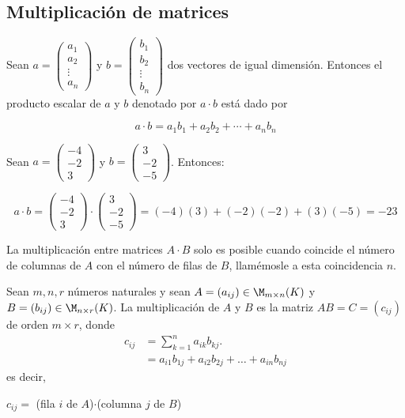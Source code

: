 \subsection{Multiplicación de matrices}


\begin{defin}
Sean $a = \begin{pmatrix} a_1 \\ a_2 \\ \vdots \\ a_n \end{pmatrix}$ y $b = \begin{pmatrix} b_1 \\ b_2 \\ \vdots \\ b_n \end{pmatrix}$ dos vectores de igual dimensión. Entonces el producto escalar de $a$ y $b$ denotado por $a \cdot b$ está dado por 

$$a \cdot b = a_1b_1 + a_2b_2 + \cdots + a_nb_n$$
\end{defin}





\begin{ejem}
Sean $a =  \begin{pmatrix} -4 \\ -2 \\ 3 \end{pmatrix}$ y $b =  \begin{pmatrix} 3 \\ -2 \\ -5 \end{pmatrix}$. Entonces:

$$a \cdot b = \begin{pmatrix} -4 \\ -2 \\ 3 \end{pmatrix} \cdot \begin{pmatrix} 3 \\ -2 \\ -5 \end{pmatrix} = (-4)(3) + (-2)(-2) + (3)(-5) = -23$$
\end{ejem}

La multiplicación entre matrices $A \cdot B$ solo es posible cuando coincide el número de columnas
de $A$ con el número de filas de $B$, llamémosle a esta coincidencia $n$.
\begin{defin}
Sean $m, n, r$ n\'umeros naturales y sean $A=(a_{ij})\in \M_{m\times n}(K)$ y \newline ${B=(b_{ij})\in \M_{n\times r}(K)}$. La multiplicaci\'on de $A$ y $B$ es la matriz $AB=C=(c_{ij})$ de orden $m\times r$, donde 
\begin{align*}
   c_{ij}&=\sum^n_{k=1}a_{ik}b_{kj}.\\
 &= a_{i1}b_{1j} + a_{i2}b_{2j} + \dots +a_{in}b_{nj} 
\end{align*}
es decir,
\begin{center}
    $c_{ij} =$ (fila $i$ de $A$)$\cdot$(columna $j$ de $B$)
\end{center}
\end{defin}


